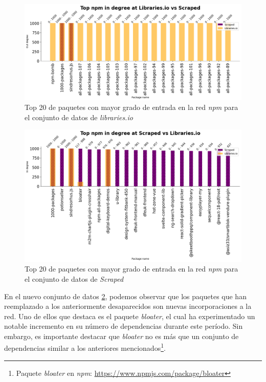 \begin{figure}[ht!]
    \begin{center}
        \includegraphics[width=1\textwidth]{img/npm/ind_ls.png}
        \caption{Top 20 de paquetes con mayor grado de entrada en la red \textit{npm} para el conjunto de datos de \textit{libraries.io}}
    \end{center}
    \label{fig:npm_ind_libraries}
\end{figure}

\begin{figure}[ht!]
    \begin{center}
        \includegraphics[width=1\textwidth]{img/npm/ind-sl.png}
        \caption{Top 20 de paquetes con mayor grado de entrada en la red \textit{npm} para el conjunto de datos de \textit{Scraped}}
    \end{center}
    \label{fig:npm_ind_scraped}
\end{figure}

En el nuevo conjunto de datos \ref{fig:npm_ind_scraped}, podemos observar que los paquetes que han reemplazado a los anteriormente desaparecidos
son nuevas incorporaciones a la red. Uno de ellos que destaca es el paquete \emph{bloater}, el cual ha experimentado
un notable incremento en su número de dependencias durante este período. Sin embargo, es importante destacar que \emph{bloater}
no es más que un conjunto de dependencias similar a los anteriores
mencionados\footnote{Paquete \emph{bloater} en \emph{npm}: \url{https://www.npmjs.com/package/bloater}}.